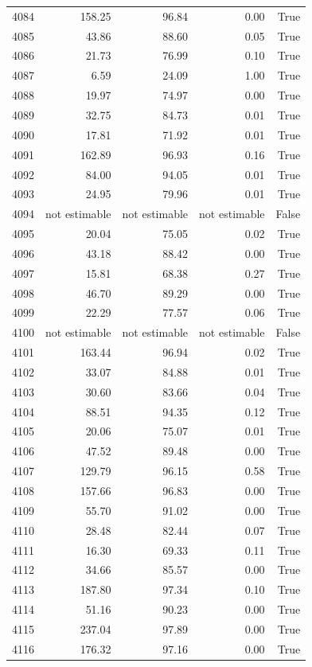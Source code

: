 \begin{longtable}{rrrrr}
4084 & 158.25 & 96.84 & 0.00 & True \\
4085 & 43.86 & 88.60 & 0.05 & True \\
4086 & 21.73 & 76.99 & 0.10 & True \\
4087 & 6.59 & 24.09 & 1.00 & True \\
4088 & 19.97 & 74.97 & 0.00 & True \\
4089 & 32.75 & 84.73 & 0.01 & True \\
4090 & 17.81 & 71.92 & 0.01 & True \\
4091 & 162.89 & 96.93 & 0.16 & True \\
4092 & 84.00 & 94.05 & 0.01 & True \\
4093 & 24.95 & 79.96 & 0.01 & True \\
4094 & not estimable & not estimable & not estimable & False \\
4095 & 20.04 & 75.05 & 0.02 & True \\
4096 & 43.18 & 88.42 & 0.00 & True \\
4097 & 15.81 & 68.38 & 0.27 & True \\
4098 & 46.70 & 89.29 & 0.00 & True \\
4099 & 22.29 & 77.57 & 0.06 & True \\
4100 & not estimable & not estimable & not estimable & False \\
4101 & 163.44 & 96.94 & 0.02 & True \\
4102 & 33.07 & 84.88 & 0.01 & True \\
4103 & 30.60 & 83.66 & 0.04 & True \\
4104 & 88.51 & 94.35 & 0.12 & True \\
4105 & 20.06 & 75.07 & 0.01 & True \\
4106 & 47.52 & 89.48 & 0.00 & True \\
4107 & 129.79 & 96.15 & 0.58 & True \\
4108 & 157.66 & 96.83 & 0.00 & True \\
4109 & 55.70 & 91.02 & 0.00 & True \\
4110 & 28.48 & 82.44 & 0.07 & True \\
4111 & 16.30 & 69.33 & 0.11 & True \\
4112 & 34.66 & 85.57 & 0.00 & True \\
4113 & 187.80 & 97.34 & 0.10 & True \\
4114 & 51.16 & 90.23 & 0.00 & True \\
4115 & 237.04 & 97.89 & 0.00 & True \\
4116 & 176.32 & 97.16 & 0.00 & True \\

\end{longtable}
